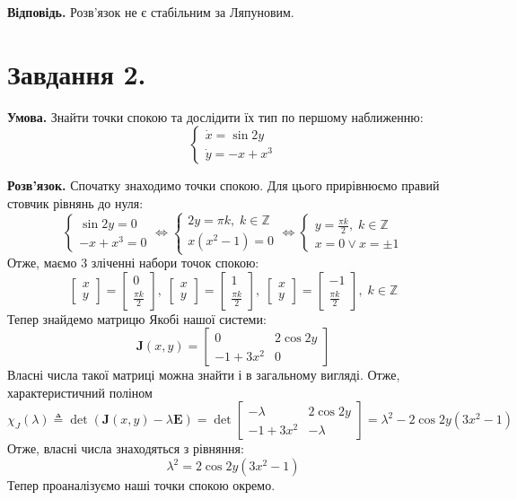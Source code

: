 \documentclass[14pt]{extarticle}
\begin{document}
\textbf{Відповідь.} Розв'язок не є стабільним за Ляпуновим.

\pagebreak
\section*{Завдання 2.}

\textbf{Умова.} Знайти точки спокою та дослідити їх тип по першому наближенню:
\[
\begin{cases}
    \dot{x} = \sin 2y \\
    \dot{y} = -x + x^3
\end{cases}
\]

\textbf{Розв'язок.} Спочатку знаходимо точки спокою. Для цього прирівнюємо правий стовчик рівнянь до нуля:
\[
\begin{cases}
    \sin 2y = 0 \\
    -x+x^3 = 0
\end{cases} \iff \begin{cases}
    2y = \pi k, \; k \in \mathbb{Z} \\
    x(x^2-1) = 0 
\end{cases} \iff \begin{cases}
    y = \frac{\pi k}{2}, \; k \in \mathbb{Z} \\
    x = 0 \vee x = \pm 1
\end{cases}
\]
Отже, маємо 3 зліченні набори точок спокою:
\[
\begin{bmatrix}
    x \\ y
\end{bmatrix} = \begin{bmatrix}
    0 \\ \frac{\pi k}{2}
\end{bmatrix}, \; \begin{bmatrix}
    x \\ y
\end{bmatrix} = \begin{bmatrix}
    1 \\ \frac{\pi k}{2}
\end{bmatrix}, \; \begin{bmatrix}
    x \\ y
\end{bmatrix} = \begin{bmatrix}
    -1 \\ \frac{\pi k}{2}
\end{bmatrix}, \; k \in \mathbb{Z}
\]
Тепер знайдемо матрицю Якобі нашої системи:
\[
\mathbf{J}(x,y) = \begin{bmatrix}
    0 & 2\cos 2y \\
    -1+3x^2 & 0
\end{bmatrix}
\]
Власні числа такої матриці можна знайти і в загальному вигляді. Отже, характеристичний поліном
\[
\chi_J(\lambda) \triangleq \det (\mathbf{J}(x,y) - \lambda \mathbf{E}) = \det \begin{bmatrix}
    -\lambda & 2 \cos 2y \\ -1+3x^2 & -\lambda
\end{bmatrix} = \lambda^2 - 2\cos 2y (3x^2-1)
\]
Отже, власні числа знаходяться з рівняння:
\[
\lambda^2 = 2\cos 2y(3x^2-1)
\]
Тепер проаналізуємо наші точки спокою окремо.
\end{document}
